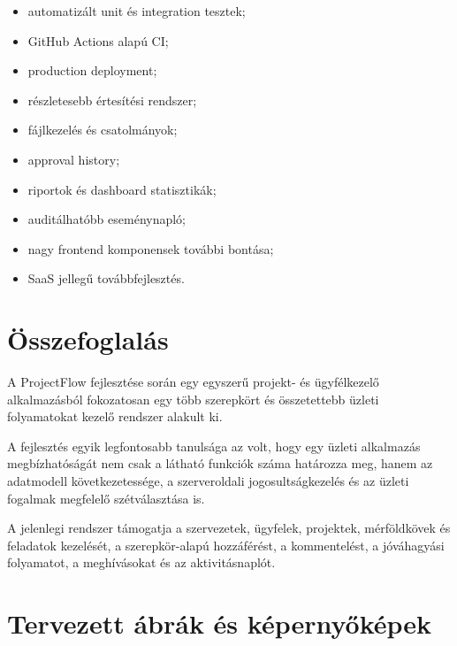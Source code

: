 \documentclass[11pt,a4paper]{report}
\newcommand{\projectname}{ProjectFlow}
\begin{document}
    \begin{itemize}
        \item automatizált unit és integration tesztek;
        \item GitHub Actions alapú CI;
        \item production deployment;
        \item részletesebb értesítési rendszer;
        \item fájlkezelés és csatolmányok;
        \item approval history;
        \item riportok és dashboard statisztikák;
        \item auditálhatóbb eseménynapló;
        \item nagy frontend komponensek további bontása;
        \item SaaS jellegű továbbfejlesztés.
    \end{itemize}

    \chapter{Összefoglalás}

    A \projectname{} fejlesztése során egy egyszerű projekt- és ügyfélkezelő
    alkalmazásból fokozatosan egy több szerepkört és összetettebb üzleti
    folyamatokat kezelő rendszer alakult ki.

    A fejlesztés egyik legfontosabb tanulsága az volt, hogy egy üzleti alkalmazás
    megbízhatóságát nem csak a látható funkciók száma határozza meg, hanem az
    adatmodell következetessége, a szerveroldali jogosultságkezelés és az üzleti
    fogalmak megfelelő szétválasztása is.

    A jelenlegi rendszer támogatja a szervezetek, ügyfelek, projektek,
    mérföldkövek és feladatok kezelését, a szerepkör-alapú hozzáférést, a
    kommentelést, a jóváhagyási folyamatot, a meghívásokat és az aktivitásnaplót.

    \appendix

    \chapter{Tervezett ábrák és képernyőképek}
\end{document}
